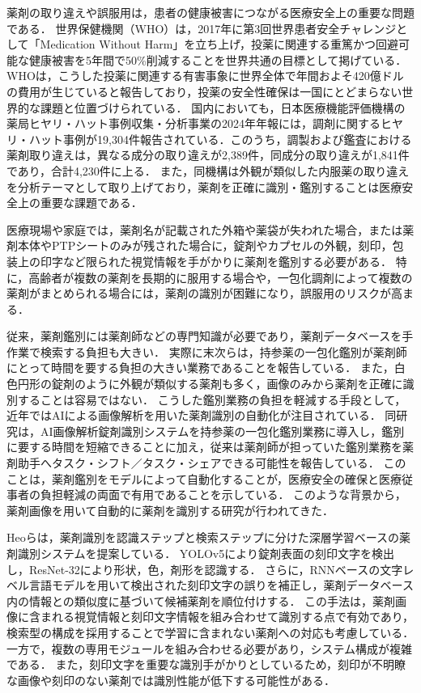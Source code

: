 \documentclass[dvipdfmx]{jsarticle}
\begin{document}
薬剤の取り違えや誤服用は，患者の健康被害につながる医療安全上の重要な問題である．
世界保健機関（WHO）は，2017年に第3回世界患者安全チャレンジとして「Medication Without Harm」を立ち上げ，投薬に関連する重篤かつ回避可能な健康被害を5年間で50\%削減することを世界共通の目標として掲げている\cite{who_medication}．
WHOは，こうした投薬に関連する有害事象に世界全体で年間およそ420億ドルの費用が生じていると報告しており，投薬の安全性確保は一国にとどまらない世界的な課題と位置づけられている．
国内においても，日本医療機能評価機構の薬局ヒヤリ・ハット事例収集・分析事業の2024年年報には，調剤に関するヒヤリ・ハット事例が19,304件報告されている．このうち，調製および鑑査における薬剤取り違えは，異なる成分の取り違えが2,389件，同成分の取り違えが1,841件であり，合計4,230件に上る\cite{jcqhc_hiyari}．
また，同機構は外観が類似した内服薬の取り違えを分析テーマとして取り上げており，薬剤を正確に識別・鑑別することは医療安全上の重要な課題である\cite{jcqhc_similarity}．

医療現場や家庭では，薬剤名が記載された外箱や薬袋が失われた場合，または薬剤本体やPTPシートのみが残された場合に，錠剤やカプセルの外観，刻印，包装上の印字など限られた視覚情報を手がかりに薬剤を鑑別する必要がある．
特に，高齢者が複数の薬剤を長期的に服用する場合や，一包化調剤によって複数の薬剤がまとめられる場合には，薬剤の識別が困難になり，誤服用のリスクが高まる．

従来，薬剤鑑別には薬剤師などの専門知識が必要であり，薬剤データベースを手作業で検索する負担も大きい．
実際に末次ら\cite{suetsugu2026ai}は，持参薬の一包化鑑別が薬剤師にとって時間を要する負担の大きい業務であることを報告している．
また，白色円形の錠剤のように外観が類似する薬剤も多く，画像のみから薬剤を正確に識別することは容易ではない．
こうした鑑別業務の負担を軽減する手段として，近年ではAIによる画像解析を用いた薬剤識別の自動化が注目されている．
同研究\cite{suetsugu2026ai}は，AI画像解析錠剤識別システムを持参薬の一包化鑑別業務に導入し，鑑別に要する時間を短縮できることに加え，従来は薬剤師が担っていた鑑別業務を薬剤助手へタスク・シフト／タスク・シェアできる可能性を報告している．
このことは，薬剤鑑別をモデルによって自動化することが，医療安全の確保と医療従事者の負担軽減の両面で有用であることを示している．
このような背景から，薬剤画像を用いて自動的に薬剤を識別する研究が行われてきた．

Heoら\cite{heo2023pill}は，薬剤識別を認識ステップと検索ステップに分けた深層学習ベースの薬剤識別システムを提案している．
YOLOv5により錠剤表面の刻印文字を検出し，ResNet-32により形状，色，剤形を認識する．
さらに，RNNベースの文字レベル言語モデルを用いて検出された刻印文字の誤りを補正し，薬剤データベース内の情報との類似度に基づいて候補薬剤を順位付けする．
この手法は，薬剤画像に含まれる視覚情報と刻印文字情報を組み合わせて識別する点で有効であり，検索型の構成を採用することで学習に含まれない薬剤への対応も考慮している．
一方で，複数の専用モジュールを組み合わせる必要があり，システム構成が複雑である．
また，刻印文字を重要な識別手がかりとしているため，刻印が不明瞭な画像や刻印のない薬剤では識別性能が低下する可能性がある．
\end{document}
